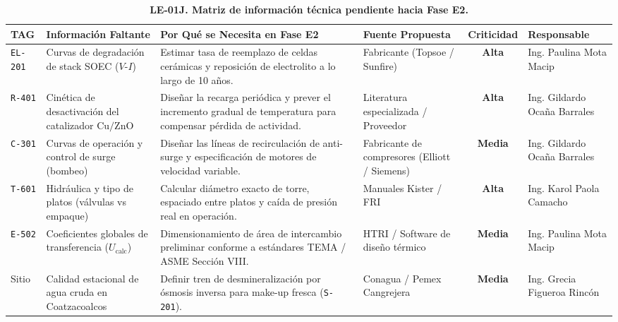 \documentclass[10pt,letterpaper]{article}
\begin{document}
\begin{table}[H]
\centering
\small
\setlength{\tabcolsep}{3.5pt}
\caption{\textbf{LE-01J. Matriz de información técnica pendiente hacia Fase E2.}} \label{tab:cuadro13}
\begin{tabularx}{\textwidth}{l >{\raggedright\arraybackslash}p{2.9cm} >{\raggedright\arraybackslash}X >{\raggedright\arraybackslash}p{2.3cm} c >{\raggedright\arraybackslash}p{2.8cm}}
\toprule
\textbf{TAG} & \textbf{Información Faltante} & \textbf{Por Qué se Necesita en Fase E2} & \textbf{Fuente Propuesta} & \textbf{Criticidad} & \textbf{Responsable} \\
\midrule
\texttt{EL-201} & Curvas de degradación de stack SOEC ($V\text{-}I$) & Estimar tasa de reemplazo de celdas cerámicas y reposición de electrolito a lo largo de 10 años. & Fabricante (Topsoe / Sunfire) & \textbf{Alta} & Ing. Paulina Mota Macip \\
\texttt{R-401} & Cinética de desactivación del catalizador $\text{Cu/ZnO}$ & Diseñar la recarga periódica y prever el incremento gradual de temperatura para compensar pérdida de actividad. & Literatura especializada / Proveedor & \textbf{Alta} & Ing. Gildardo Ocaña Barrales \\
\texttt{C-301} & Curvas de operación y control de surge (bombeo) & Diseñar las líneas de recirculación de anti-surge y especificación de motores de velocidad variable. & Fabricante de compresores (Elliott / Siemens) & \textbf{Media} & Ing. Gildardo Ocaña Barrales \\
\texttt{T-601} & Hidráulica y tipo de platos (válvulas vs empaque) & Calcular diámetro exacto de torre, espaciado entre platos y caída de presión real en operación. & Manuales Kister / FRI & \textbf{Alta} & Ing. Karol Paola Camacho \\
\texttt{E-502} & Coeficientes globales de transferencia ($U_{\text{calc}}$) & Dimensionamiento de área de intercambio preliminar conforme a estándares TEMA / ASME Sección VIII. & HTRI / Software de diseño térmico & \textbf{Media} & Ing. Paulina Mota Macip \\
Sitio & Calidad estacional de agua cruda en Coatzacoalcos & Definir tren de desmineralización por ósmosis inversa para make-up fresca (\texttt{S-201}). & Conagua / Pemex Cangrejera & \textbf{Media} & Ing. Grecia Figueroa Rincón \\
\bottomrule
\end{tabularx}
\end{table}

\newpage
\end{document}
